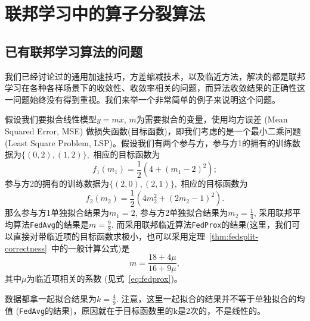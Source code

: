 \section{联邦学习中的算子分裂算法}
\label{sec:chap2-operator-split}


\subsection{已有联邦学习算法的问题}
\label{subsec:chap2-os-intro}

我们已经讨论过的通用加速技巧\cite{reddi2020fed_opt}，方差缩减技术\cite{karimireddy2020scaffold}，以及临近方法\cite{sahu2018fedprox}，解决的都是联邦学习在各种各样场景下的收敛性、收敛率相关的问题，而算法收敛结果的正确性这一问题始终没有得到重视。我们来举一个非常简单的例子来说明这个问题。

\begin{example}
\label{eg:correctness}
假设我们要拟合线性模型$y = mx$, $m$为需要拟合的变量，使用均方误差 (Mean Squared Error, MSE) 做损失函数(目标函数)，即我们考虑的是一个最小二乘问题 (Least Square Problem, LSP)。假设我们有两个参与方，参与方1的拥有的训练数据为$\{ (0, 2), (1, 2) \},$ 相应的目标函数为
\begin{equation*}
f_1(m_1) = \frac{1}{2} (4 + (m_1 - 2)^2);
\end{equation*}
参与方2的拥有的训练数据为$\{ (2, 0), (2, 1) \},$ 相应的目标函数为
\begin{equation*}
f_2(m_2) = \frac{1}{2} (4m_2^2 + (2m_2 - 1)^2).
\end{equation*}
那么参与方1单独拟合结果为$m_1 = 2$, 参与方2单独拟合结果为$m_2 = \frac{1}{4}$, 采用联邦平均算法\texttt{FedAvg}的结果是$m = \frac{9}{8}.$ 而采用联邦临近算法\texttt{FedProx}的结果(这里，我们可以直接对带临近项的目标函数求极小，也可以采用定理~\ref{thm:fedsplit-correctness}~中的一般计算公式)是
\begin{equation}
\label{eq:eg-correctness-fedprox}
m = \frac{18 + 4\mu}{16 + 9\mu},
\end{equation}
其中$\mu$为临近项相关的系数 (见式~\eqref{eq:fedprox})。

数据都拿一起拟合结果为$k = \frac{4}{9}.$ 注意，这里一起拟合的结果并不等于单独拟合的均值 (\texttt{FedAvg}的结果)，原因就在于目标函数里的k是2次的，不是线性的。
\end{example}

